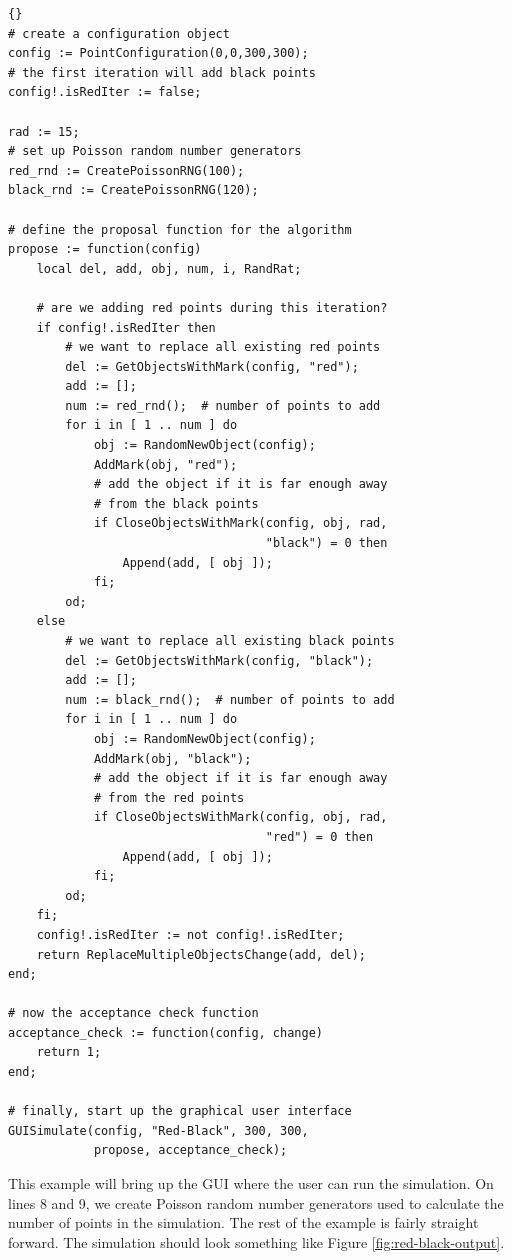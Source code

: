 \lstset{labelstyle=\tiny,labelstep=4}
\begin{lstlisting}{}
# create a configuration object
config := PointConfiguration(0,0,300,300);
# the first iteration will add black points
config!.isRedIter := false;

rad := 15;
# set up Poisson random number generators
red_rnd := CreatePoissonRNG(100);
black_rnd := CreatePoissonRNG(120);

# define the proposal function for the algorithm
propose := function(config)
    local del, add, obj, num, i, RandRat;

    # are we adding red points during this iteration?
    if config!.isRedIter then
        # we want to replace all existing red points
        del := GetObjectsWithMark(config, "red");
        add := [];
        num := red_rnd();  # number of points to add
        for i in [ 1 .. num ] do
            obj := RandomNewObject(config);
            AddMark(obj, "red");
            # add the object if it is far enough away
            # from the black points
            if CloseObjectsWithMark(config, obj, rad,
                                    "black") = 0 then
                Append(add, [ obj ]);
            fi;
        od;
    else
        # we want to replace all existing black points
        del := GetObjectsWithMark(config, "black");
        add := [];
        num := black_rnd();  # number of points to add
        for i in [ 1 .. num ] do
            obj := RandomNewObject(config);
            AddMark(obj, "black");
            # add the object if it is far enough away
            # from the red points
            if CloseObjectsWithMark(config, obj, rad,
                                    "red") = 0 then
                Append(add, [ obj ]);
            fi;
        od;
    fi;
    config!.isRedIter := not config!.isRedIter;
    return ReplaceMultipleObjectsChange(add, del);
end;

# now the acceptance check function
acceptance_check := function(config, change)
    return 1;
end;

# finally, start up the graphical user interface
GUISimulate(config, "Red-Black", 300, 300,
            propose, acceptance_check);
\end{lstlisting}

\noindent This example will bring up the GUI where the user can run
the simulation.  On lines 8 and 9, we create Poisson random number
generators used to calculate the number of points in the simulation.
The rest of the example is fairly straight forward.  The simulation
should look something like Figure \ref{fig:red-black-output}.

